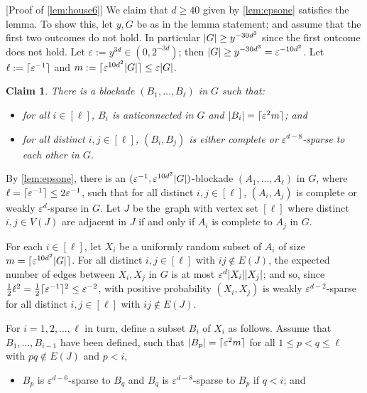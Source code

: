 \documentclass[11pt,reqno,a4paper]{amsart}
\newtheorem{claim}{Claim}[theorem]
\let\oldendproof\endproof
\renewenvironment{proof}[1][\proofname]{%
	\oldproof[\normalfont\bfseries #1]%
}{\oldendproof}
\renewcommand{\qedsymbol}{$\blacksquare$}%
\newenvironment{subproof}[1][\normalfont\it Subproof]{%
	\renewcommand{\qedsymbol}{$\square$}%
	\begin{proof}[#1]%
	}{%
	\end{proof}%
}
\newcommand{\eps}{\varepsilon}
\newcommand{\nin}{\notin}
\DeclarePairedDelimiter\abs{\lvert}{\rvert}%
\DeclarePairedDelimiter\ceil{\lceil}{\rceil}%
\begin{document}
	\begin{proof}
		[Proof of \cref{lem:house6}]
		We claim that $d\ge40$ given by \cref{lem:epsone} satisfies the lemma.
		To show this, let $y,G$ be as in the lemma statement;
		and assume that the first two outcomes do not hold.
		In particular $\abs G\ge y^{-30d^3}$ since the first outcome does not hold.
		Let $\eps:=y^{3d}\in (0,2^{-3d})$;
		then $\abs G\ge y^{-30d^3}= \eps^{-10d^2}$.
		Let $\ell:=\ceil{\eps^{-1}}$ and $m:=\ceil{\eps^{10d^2}\abs G}\le \eps\abs G$.
		\begin{claim}
			\label{claim:clean}
			There is a blockade $(B_1,\ldots,B_{\ell})$ in $G$ such that:
			\begin{itemize}
				\item for all $i\in[\ell]$, $B_i$ is anticonnected in $G$ and $\abs{B_i}=\ceil{\eps^2m}$; and
				
				\item for all distinct $i,j\in[\ell]$, $(B_i,B_j)$ is either complete or $\eps^{d-8}$-sparse to each other in $G$.
			\end{itemize}
		\end{claim}
		\begin{subproof}
			By \cref{lem:epsone}, there is an $(\eps^{-1},{\eps^{10d^2}\abs G})$-blockade $(A_1,\ldots,A_{\ell})$ in $G$, where $\ell=\ceil{\eps^{-1}}\le2\eps^{-1}$, such that for all distinct $i,j\in[\ell]$, $(A_i,A_j)$ is complete or weakly $\eps^d$-sparse in $G$.
			Let $J$ be the~graph with vertex set $[\ell]$ where distinct $i,j\in V(J)$ are adjacent in $J$ if and only if $A_i$ is complete to $A_j$ in $G$.
			
			For each $i\in[\ell]$, let $X_i$ be a uniformly random subset of $A_i$ of size $m=\ceil{\eps^{10d^2}\abs G}$.
			For all distinct $i,j\in[\ell]$ with $ij\nin E(J)$, the expected number of edges between $X_i,X_j$ in $G$ is at most $\eps^d\abs{X_i}\abs{X_j}$;
			and so, since $\frac12\ell^2=\frac12\ceil{\eps^{-1}}^2\le\eps^{-2}$, with positive probability $(X_i,X_j)$ is weakly $\eps^{d-2}$-sparse for all distinct $i,j\in[\ell]$ with $ij\nin E(J)$.
			
			For $i=1,2,\ldots,\ell$ in turn, define a subset $B_i$ of $X_i$ as follows.
			Assume that $B_1,\ldots,B_{i-1}$ have been defined, such that $\abs{B_p}=\ceil{\eps^2m}$ for all $1\le p<q\le\ell$ with $pq\nin E(J)$ and $p<i$,
			\begin{itemize}
				\item $B_p$ is $\eps^{d-6}$-sparse to $B_q$ and $B_q$ is $\eps^{d-8}$-sparse to $B_p$ if $q<i$; and
				

\end{itemize}
\end{subproof}
\end{proof}
\end{document}
